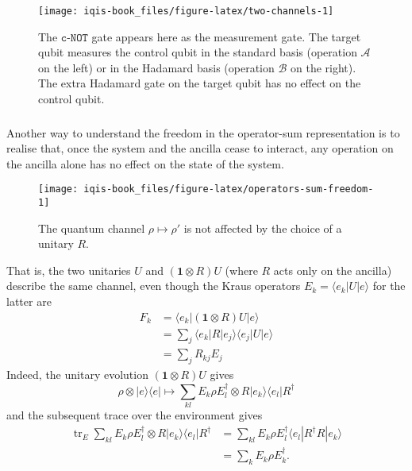 \documentclass[fleqn]{article}
\begin{document}
\begin{figure}[H]

{\centering \texttt{[image: iqis-book\_files/figure-latex/two-channels-1]} 

}

\caption{The \(\texttt{c-NOT}\) gate appears here as the measurement gate. The target qubit measures the control qubit in the standard basis (operation \(\mathcal{A}\) on the left) or in the Hadamard basis (operation \(\mathcal{B}\) on the right). The extra Hadamard gate on the target qubit has no effect on the control qubit.}\label{fig:two-channels}
\end{figure}

\hypertarget{section-34}{%
\subsubsection{}\label{section-34}}

Another way to understand the freedom in the operator-sum representation is to realise that, once the system and the ancilla cease to interact, any operation on the ancilla alone has no effect on the state of the system.



\begin{figure}[H]

{\centering \texttt{[image: iqis-book\_files/figure-latex/operators-sum-freedom-1]} 

}

\caption{The quantum channel \(\rho\mapsto\rho'\) is not affected by the choice of a unitary \(R\).}\label{fig:operators-sum-freedom}
\end{figure}

That is, the two unitaries \(U\) and \((\mathbf{1}\otimes R)U\) (where \(R\) acts only on the ancilla) describe the same channel, even though the Kraus operators \(E_k=\langle e_k|U|e\rangle\) for the latter are
\[
  \begin{aligned}
    F_k
    &= \langle e_k|(\mathbf{1}\otimes R)U|e\rangle
  \\&= \sum_j \langle e_k|R|e_j\rangle\langle e_j|U|e\rangle
  \\&= \sum_j R_{kj}E_j
  \end{aligned}
\]
Indeed, the unitary evolution \((\mathbf{1}\otimes R) U\) gives
\[
  \rho\otimes|e\rangle\langle e|
  \longmapsto
  \sum_{kl} E_k \rho E_l^\dagger \otimes R|e_k\rangle\langle e_l| R^\dagger
\]
and the subsequent trace over the environment gives
\[
  \begin{aligned}
    \operatorname{tr}_E \sum_{kl} E_k \rho E_l^\dagger \otimes R|e_k\rangle\langle e_l| R^\dagger
    &= \sum_{kl} E_k \rho E_l^\dagger \langle e_l| R^\dagger R|e_k\rangle
  \\&= \sum_{k} E_k \rho E_k^\dagger.
  \end{aligned}
\]
\end{document}
